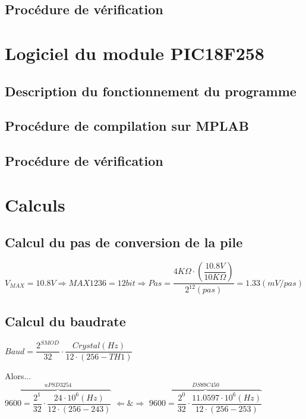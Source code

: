 \documentclass[10pt,a4paper,final]{article}
\begin{document}
\begin{spacing}{1.5}
\subsection{Procédure de vérification}


\section{Logiciel du module PIC18F258}
\subsection{Description du fonctionnement du programme}

\subsection{Procédure de compilation sur MPLAB}

\subsection{Procédure de vérification}

\pagebreak
\section{Calculs}
\subsection{Calcul du pas de conversion de la pile}
$V_{MAX}=10.8V \Rightarrow MAX1236  = 12 bit \Rightarrow Pas = \dfrac{4K\Omega \cdot \left(\dfrac{10.8V}{10K\Omega}\right)}{2^{12}(pas)} = 1.33(mV/pas)$
\subsection{Calcul du baudrate}
$Baud = \dfrac{2^{SMOD}}{32}\cdot\dfrac{Crystal (Hz)}{12\cdot(256 - TH1)}$\\
\pagebreak

Alors...\\


$\overbrace{9600 = \dfrac{2^{1}}{32} \cdot \dfrac{24\cdot10^{6}(Hz)}{12\cdot(256 - 243)}}^{uPSD 3254} $ $\Leftarrow \& \Rightarrow $ $ \overbrace{9600 = \dfrac{2^{0}}{32}\cdot \dfrac{11.0597 \cdot 10^{6}(Hz)}{12\cdot(256 - 253)}}^{DS89C450}$






\end{spacing}
\end{document}
